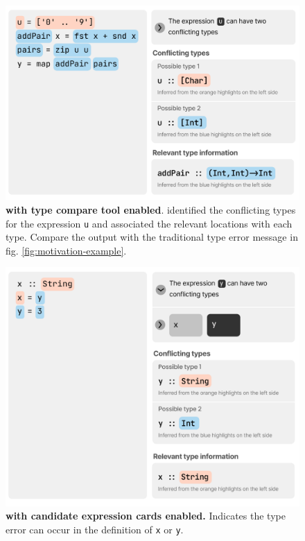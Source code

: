 \begin{figure}
    \centering
    \includegraphics[width=\linewidth, trim=0mm 10mm 0mm 0mm]{images/intro-compare-2.pdf}
    \caption{
        \textbf{\chameleon{} with type compare tool enabled}. \chameleon{} identified the conflicting types for the expression \texttt{u} and associated the relevant locations with each type. Compare the output with the traditional type error message in fig. \ref{fig:motivation-example}.
}
    \label{fig:compare}
\end{figure}

\begin{figure}
    \centering
    \includegraphics[width=\linewidth, trim=0mm 10mm 0mm 0mm]{images/intro-candidate.pdf}
    \caption{
        \textbf{\chameleon{} with candidate expression cards enabled.}
        Indicates the type error can occur in the definition of \texttt{x} or \texttt{y}.
    }
    \label{fig:expression}
\end{figure}


